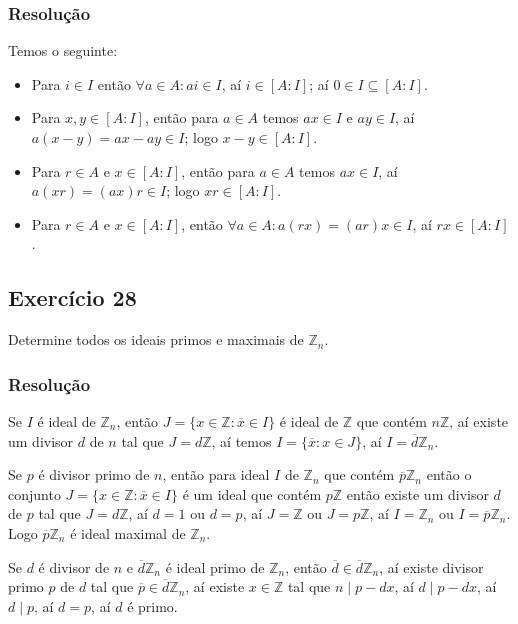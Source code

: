 \documentclass[10pt,a4paper]{article}
\begin{document}
\subsubsection*{Resolução}

Temos o seguinte:
\begin{itemize}
\item Para $i\in I$ então $\forall a\in A:ai\in I$, aí $i\in[A:I]$; aí $0\in I\subseteq[A:I]$.
\item Para $x,y\in[A:I]$, então para $a\in A$ temos $ax\in I$ e $ay\in I$, aí $a(x-y)=ax-ay\in I$; logo $x-y\in[A:I]$.
\item Para $r\in A$ e $x\in[A:I]$, então para $a\in A$ temos $ax\in I$, aí $a(xr)=(ax)r\in I$; logo $xr\in[A:I]$.
\item Para $r\in A$ e $x\in[A:I]$, então $\forall a\in A:a(rx)=(ar)x\in I$, aí $rx\in[A:I]$.
\end{itemize}

\subsection*{Exercício 28}
Determine todos os ideais primos e maximais de $\mathbb{Z}_n$.

\subsubsection*{Resolução}

Se $I$ é ideal de $\mathbb{Z}_n$, então $J=\{x\in\mathbb{Z}:\overline{x}\in I\}$ é ideal de $\mathbb{Z}$ que contém $n\mathbb{Z}$, aí existe um divisor $d$ de $n$ tal que $J=d\mathbb{Z}$, aí temos $I=\{\overline{x}:x\in J\}$, aí $I=\overline{d}\mathbb{Z}_n$.

\medskip
\noindent
Se $p$ é divisor primo de $n$, então para ideal $I$ de $\mathbb{Z}_n$ que contém $\overline{p}\mathbb{Z}_n$ então o conjunto $J=\{x\in\mathbb{Z}:\overline{x}\in I\}$ é um ideal que contém $p\mathbb{Z}$ então existe um divisor $d$ de $p$ tal que $J=d\mathbb{Z}$, aí $d=1$ ou $d=p$, aí $J=\mathbb{Z}$ ou $J=p\mathbb{Z}$, aí $I=\mathbb{Z}_n$ ou $I=\overline{p}\mathbb{Z}_n$. Logo $\overline{p}\mathbb{Z}_n$ é ideal maximal de $\mathbb{Z}_n$.

\medskip
\noindent
Se $d$ é divisor de $n$ e $\overline{d}\mathbb{Z}_n$ é ideal primo de $\mathbb{Z}_n$, então $\overline{d}\in\overline{d}\mathbb{Z}_n$, aí existe divisor primo $p$ de $d$ tal que $\overline{p}\in\overline{d}\mathbb{Z}_n$, aí existe $x\in\mathbb{Z}$ tal que $n\mid p-dx$, aí $d\mid p-dx$, aí $d\mid p$, aí $d=p$, aí $d$ é primo.
\end{document}
